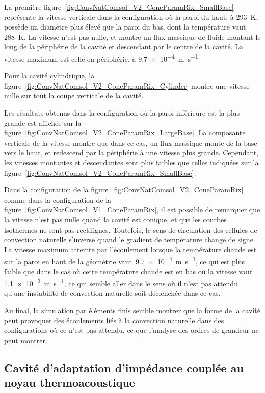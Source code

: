 La première figure~\ref{fig:ConvNatComsol_V2_ConeParamRix_SmallBase} représente la vitesse verticale dans la configuration où la paroi du haut, à \qty{293}{\kelvin}, possède un diamètre plus élevé que la paroi du bas, dont la température vaut \qty{288}{\kelvin}. La vitesse n'est pas nulle, et montre un flux massique de fluide montant le long de la périphérie de la cavité et descendant par le centre de la cavité. La vitesse maximum est celle en périphérie, à \qty{9.7e-4}{\meter\per\second}\smallskip

Pour la cavité cylindrique, la figure~\ref{fig:ConvNatComsol_V2_ConeParamRix_Cylinder} montre une vitesse nulle sur tout la coupe verticale de la cavité.\smallskip

Les résultats obtenus dans la configuration où la paroi inférieure est la plus grande est affichée sur la figure~\ref{fig:ConvNatComsol_V2_ConeParamRix_LargeBase}. La composante verticale de la vitesse montre que dans ce cas, un flux massique monte de la base vers le haut, et redescend par la périphérie à une vitesse plus grande. Cependant, les vitesses montantes et descendantes sont plus faibles que celles indiquées sur la figure~\ref{fig:ConvNatComsol_V2_ConeParamRix_SmallBase}.\medskip

Dans la configuration de la figure~\ref{fig:ConvNatComsol_V2_ConeParamRix} comme dans la configuration de la figure~\ref{fig:ConvNatComsol_V1_ConeParamRix}, il est possible de remarquer que la vitesse n'est pas nulle quand la cavité est conique, et que les courbes isothermes ne sont pas rectilignes. Toutefois, le sens de circulation des cellules de convection naturelle s'inverse quand le gradient de température change de signe. La vitesse maximum atteinte par l'écoulement lorsque la température chaude est sur la paroi en haut de la géométrie vaut~\qty{9.7e-4}{\meter\per\second}, ce qui est plus faible que dans le cas où cette température chaude est en bas où la vitesse vaut \qty{1.1e-3}{\meter\per\second}, ce qui semble aller dans le sens où il n'est pas attendu qu'une instabilité de convection naturelle soit déclenchée dans ce cas.\medskip

Au final, la simulation par éléments finis semble montrer que la forme de la cavité peut provoquer des écoulements liés à la convection naturelle dans des configurations où ce n'est pas attendu, ce que l'analyse des ordres de grandeur ne peut montrer.


\subsection{Cavité d'adaptation d'impédance couplée au noyau thermoacoustique}
